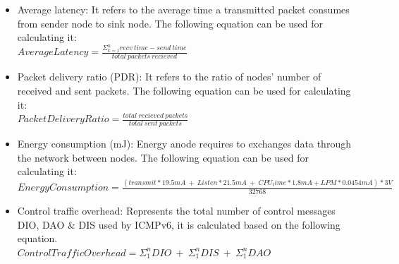 \begin{itemize}
\item Average latency: It refers to the average time a transmitted packet consumes from sender node to sink node. The following equation can be used for calculating it:\\
$ Average Latency = \frac{\Sigma_{k=1}^{n}recv\ time-send\ time}{total\ packets\ recieved} $
\item Packet delivery ratio (PDR): It refers to the ratio of nodes’ number of received and sent packets. The following equation can be used for calculating it:\\
$ Packet Delivery Ratio = \frac{total\ recieved\ packets} {total\ sent\ packets}  $
\item Energy consumption (mJ): Energy anode requires to exchanges data through the network between nodes. The following equation can be used for calculating it:\\
$ EnergyConsumption = \frac{(transmit*19.5mA\ +\ Listen*21.5mA\ +\ CPU_time*1.8mA + LPM*0.0454mA)*3V} {32768} $
\item Control traffic overhead: Represents the total number of control messages DIO, DAO \& DIS used by ICMPv6, it is calculated based on the following equation.\\
$ ControlTrafficOverhead = \Sigma_{1}^{n}DIO\ +\ \Sigma_{1}^{n}DIS\ +\ \Sigma_{1}^{n}DAO $
\end{itemize}

